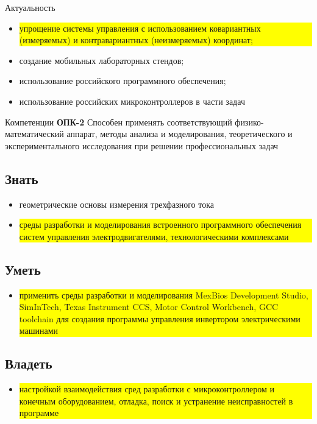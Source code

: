 \newpage
\begin{section}{Актуальность}
\begin{itemize}
\item \colorbox{yellow}{\parbox[t]{\textwidth}{упрощение системы управления с использованием
ковариантных (измеряемых) и контравариантных
(неизмеряемых) координат;}}
\item создание мобильных лабораторных стендов;
\item использование российского программного обеспечения;
\item использование российских микроконтроллеров в части задач
\end{itemize}
\end{section}

\newpage
\begin{section}{Компетенции}
{\bf ОПК-2} Способен применять соответствующий физико-математический аппарат, методы анализа и моделирования, теоретического и экспериментального исследования при решении профессиональных задач

\subsection*{Знать}
\begin{itemize}
\item геометрические основы измерения трехфазного тока
\item 
\colorbox{yellow}{\parbox[t]{\textwidth}{среды разработки и моделирования встроенного программного обеспечения систем управления электродвигателями, технологическими комплексами}}
\end{itemize}
\subsection*{Уметь}
\begin{itemize}
\item
\colorbox{yellow}{\parbox[t]{\textwidth}{применить среды разработки и моделирования MexBios Development Studio, SimInTech, Texas Instrument CCS, Motor Control Workbench, GCC toolchain для создания программы управления инвертором электрическими машинами}}
\end{itemize}
\subsection*{Владеть}
\begin{itemize}
\item
\colorbox{yellow}{\parbox[t]{\textwidth}{настройкой взаимодействия сред разработки с микроконтроллером и конечным оборудованием, отладка, поиск и устранение неисправностей в программе}}
\end{itemize}
\end{section}

